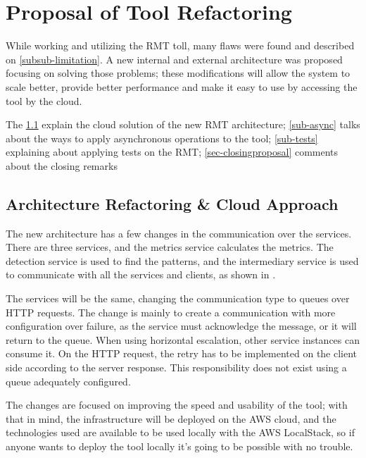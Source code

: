 \chapter{Proposal of Tool Refactoring}%
\label{chapt-proposta}

While working and utilizing the RMT toll, many flaws were found and described on \cref{subsub-limitation}. A new internal and external architecture was proposed focusing on solving those problems; these modifications will allow the system to scale better, provide better performance and make it easy to use by accessing the tool by the cloud.

The \cref{sec-cloud} explain the cloud solution of the new RMT architecture; \cref{sub-async} talks about the ways to apply asynchronous operations to the tool; \cref{sub-tests} explaining about applying tests on the RMT; \cref{sec-closingproposal} comments about the closing remarks


\section{Architecture Refactoring \& Cloud Approach}
\label{sec-cloud}
The new architecture has a few changes in the communication over the services. There are three services, and the metrics service calculates the metrics. The detection service is used to find the patterns, and the intermediary service is used to communicate with all the services and clients, as shown in .

The services will be the same, changing the communication type to queues over HTTP requests. The change is mainly to create a communication with more configuration over failure, as the service must acknowledge the message, or it will return to the queue. When using horizontal escalation, other service instances can consume it. On the HTTP request, the retry has to be implemented on the client side according to the server response. This responsibility does not exist using a queue adequately configured.

The changes are focused on improving the speed and usability of the tool; with that in mind, the infrastructure will be deployed on the AWS cloud, and the technologies used are available to be used locally with the AWS LocalStack, so if anyone wants to deploy the tool locally it's going to be possible with no trouble.

